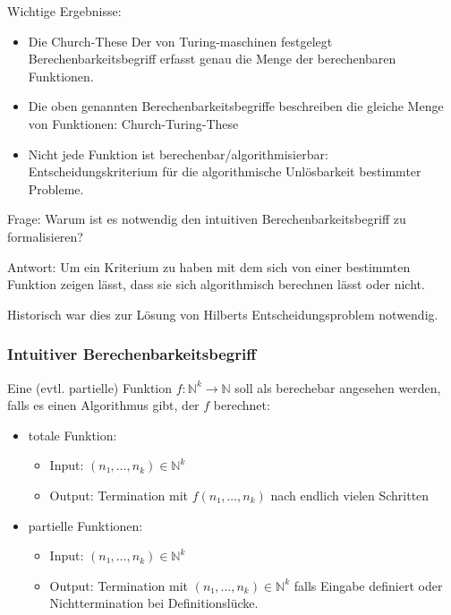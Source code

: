 \documentclass{scrartcl}
\begin{document}
\begin{theorem}
\begin{theorem}
\begin{poof}
\begin{theorem}
Wichtige Ergebnisse:
\begin{itemize}
	\item Die Church-These
			Der von Turing-maschinen festgelegt Berechenbarkeitsbegriff
			erfasst genau die Menge der berechenbaren Funktionen. 
	\item Die oben genannten Berechenbarkeitsbegriffe beschreiben die gleiche
			Menge von Funktionen:
			Church-Turing-These
	\item Nicht jede Funktion ist berechenbar/algorithmisierbar:
			Entscheidungskriterium für die algorithmische Unlösbarkeit 
			bestimmter Probleme.
\end{itemize}

\begin{remark}
Frage: Warum ist es notwendig den intuitiven Berechenbarkeitsbegriff zu formalisieren?

Antwort: 
Um ein Kriterium zu haben mit dem sich von einer bestimmten Funktion zeigen
lässt, dass sie sich algorithmisch berechnen lässt oder nicht.

Historisch war dies zur Lösung von Hilberts Entscheidungsproblem notwendig.
\end{remark}

\subsubsection{Intuitiver Berechenbarkeitsbegriff}

\begin{remark}
Eine (evtl. partielle) Funktion $f : ℕ^k → ℕ$ soll als berechebar angesehen 
werden, falls es einen Algorithmus gibt, der $f$ berechnet:
\begin{itemize}
\item totale Funktion:
	\begin{itemize}
	\item Input: $(n₁,\dots,n_k) ∈ ℕ^k$ 
	\item Output: Termination mit $f(n₁,\dots,n_k)$ nach endlich vielen Schritten
	\end{itemize}
\item partielle Funktionen:
	\begin{itemize}
	\item Input: $(n₁,\dots,n_k) ∈ ℕ^k$ 
	\item Output: Termination mit $(n₁,\dots,n_k) ∈ ℕ^k$ falls Eingabe definiert 
			oder Nichttermination bei Definitionslücke.
	\end{itemize}
\end{itemize}


\end{remark}
\end{theorem}
\end{poof}
\end{theorem}
\end{theorem}
\end{document}
